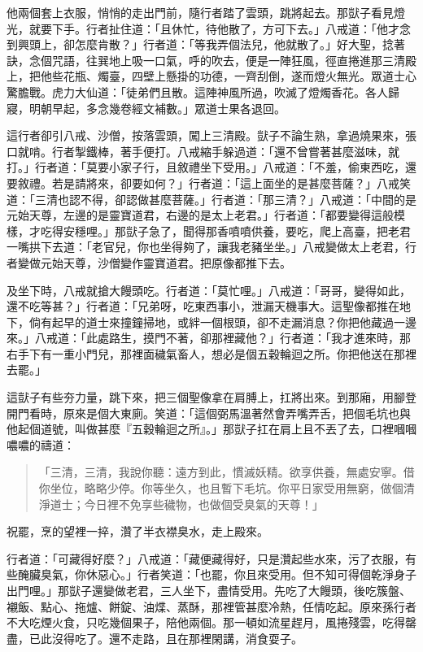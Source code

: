 他兩個套上衣服，悄悄的走出門前，隨行者踏了雲頭，跳將起去。那獃子看見燈光，就要下手。行者扯住道：「且休忙，待他散了，方可下去。」八戒道：「他才念到興頭上，卻怎麼肯散？」行者道：「等我弄個法兒，他就散了。」好大聖，捻著訣，念個咒語，往巽地上吸一口氣，呼的吹去，便是一陣狂風，徑直捲進那三清殿上，把他些花瓶、燭臺，四壁上懸掛的功德，一齊刮倒，遂而燈火無光。眾道士心驚膽戰。虎力大仙道：「徒弟們且散。這陣神風所過，吹滅了燈燭香花。各人歸寢，明朝早起，多念幾卷經文補數。」眾道士果各退回。

這行者卻引八戒、沙僧，按落雲頭，闖上三清殿。獃子不論生熟，拿過燒果來，張口就啃。行者掣鐵棒，著手便打。八戒縮手躲過道：「還不曾嘗著甚麼滋味，就打。」行者道：「莫要小家子行，且敘禮坐下受用。」八戒道：「不羞，偷東西吃，還要敘禮。若是請將來，卻要如何？」行者道：「這上面坐的是甚麼菩薩？」八戒笑道：「三清也認不得，卻認做甚麼菩薩。」行者道：「那三清？」八戒道：「中間的是元始天尊，左邊的是靈寶道君，右邊的是太上老君。」行者道：「都要變得這般模樣，才吃得安穩哩。」那獃子急了，聞得那香噴噴供養，要吃，爬上高臺，把老君一嘴拱下去道：「老官兒，你也坐得夠了，讓我老豬坐坐。」八戒變做太上老君，行者變做元始天尊，沙僧變作靈寶道君。把原像都推下去。

及坐下時，八戒就搶大饅頭吃。行者道：「莫忙哩。」八戒道：「哥哥，變得如此，還不吃等甚？」行者道：「兄弟呀，吃東西事小，泄漏天機事大。這聖像都推在地下，倘有起早的道士來撞鐘掃地，或絆一個根頭，卻不走漏消息？你把他藏過一邊來。」八戒道：「此處路生，摸門不著，卻那裡藏他？」行者道：「我才進來時，那右手下有一重小門兒，那裡面穢氣畜人，想必是個五穀輪迴之所。你把他送在那裡去罷。」

這獃子有些夯力量，跳下來，把三個聖像拿在肩膊上，扛將出來。到那廂，用腳登開門看時，原來是個大東廁。笑道：「這個弼馬溫著然會弄嘴弄舌，把個毛坑也與他起個道號，叫做甚麼『五穀輪迴之所』。」那獃子扛在肩上且不丟了去，口裡嘓嘓噥噥的禱道：
\begin{quote}
「三清，三清，我說你聽：遠方到此，慣滅妖精。欲享供養，無處安寧。借你坐位，略略少停。你等坐久，也且暫下毛坑。你平日家受用無窮，做個清淨道士；今日裡不免享些穢物，也做個受臭氣的天尊！」
\end{quote}

祝罷，烹的望裡一捽，灒了半衣襟臭水，走上殿來。

行者道：「可藏得好麼？」八戒道：「藏便藏得好，只是灒起些水來，污了衣服，有些醃臟臭氣，你休惡心。」行者笑道：「也罷，你且來受用。但不知可得個乾淨身子出門哩。」那獃子還變做老君，三人坐下，盡情受用。先吃了大饅頭，後吃簇盤、襯飯、點心、拖爐、餅錠、油煠、蒸酥，那裡管甚麼冷熱，任情吃起。原來孫行者不大吃煙火食，只吃幾個果子，陪他兩個。那一頓如流星趕月，風捲殘雲，吃得罄盡，已此沒得吃了。還不走路，且在那裡閑講，消食耍子。

